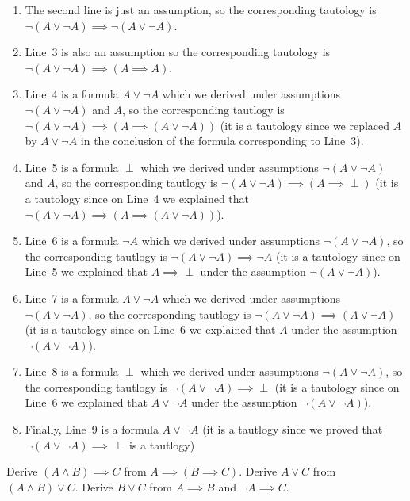 \begin{enumerate}
  \item The second line is just an assumption, so the corresponding tautology is
    $\lnot (A \lor \lnot A) \implies \lnot (A \lor \lnot A)$.
  \item Line~3 is also an assumption so the corresponding tautology is
    $\lnot (A \lor \lnot A) \implies (A \implies A)$.
  \item Line~4 is a formula $A \lor \lnot A$ which we derived under assumptions
    $\lnot (A \lor \lnot A)$ and $A$, so the corresponding tautlogy is
    $\lnot (A \lor \lnot A) \implies (A \implies (A \lor \lnot A))$ (it is a
    tautology since we replaced $A$ by $A \lor \lnot A$ in the conclusion of
    the formula corresponding to Line~3).
  \item Line~5 is a formula $\perp$ which we derived under assumptions
    $\lnot (A \lor \lnot A)$ and $A$, so the corresponding tautlogy is
    $\lnot (A \lor \lnot A) \implies (A \implies \perp)$ (it is a
    tautology since on Line~4 we explained that $\lnot (A \lor \lnot A)
    \implies (A \implies (A \lor \lnot A))$).
  \item Line~6 is a formula $\lnot A$ which we derived under assumptions
    $\lnot (A \lor \lnot A)$, so the corresponding tautlogy is
    $\lnot (A \lor \lnot A) \implies \lnot A$ (it is a
    tautology since on Line~5 we explained that $A \implies \perp$ under the
    assumption $\lnot (A \lor \lnot A)$).
  \item Line~7 is a formula $A \lor \lnot A$ which we derived under assumptions
    $\lnot (A \lor \lnot A)$, so the corresponding tautlogy is
    $\lnot (A \lor \lnot A) \implies (A \lor \lnot A)$ (it is a
    tautology since on Line~6 we explained that $A$ under the
    assumption $\lnot (A \lor \lnot A)$).
  \item Line~8 is a formula $\perp$ which we derived under assumptions
    $\lnot (A \lor \lnot A)$, so the corresponding tautlogy is
    $\lnot (A \lor \lnot A) \implies \perp$ (it is a
    tautology since on Line~6 we explained that $A \lor \lnot A$ under the
    assumption $\lnot (A \lor \lnot A)$).
  \item Finally, Line~9 is a formula $A \lor \lnot A$ (it is a tautlogy since
    we proved that $\lnot (A \lor \lnot A) \implies \perp$ is a tautlogy)
\end{enumerate}



\begin{chapterendexercises}
  \exercise Derive $(A \land B) \implies C$ from
    $A \implies (B \implies C)$.
  \exercise Derive $A \lor C$ from
    $(A \land B) \lor C$.
  \exercise Derive $B \lor C$ from
    $A \implies B$ and $\lnot A \implies C$.
\end{chapterendexercises}
